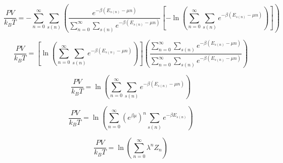 \documentclass[12pt]{article}
\begin{document}
\begin{equation}\frac{PV}{k_BT}=-\sum_{n=0}^\infty\sum_{s(n)}\left(\frac{e^{-\beta(E_{s(n)}-\mu{n})}}{\sum_{n=0}^\infty\sum_{s(n)}e^{-\beta(E_{s(n)}-\mu{n})}} \left[-\ln{\left(\sum_{n=0}^\infty\sum_{s(n)}e^{-\beta(E_{s(n)}-\mu{n})}\right)}\right]\right)\end{equation}

\begin{equation}\frac{PV}{k_BT}=\left[\ln{\left(\sum_{n=0}^\infty\sum_{s(n)}e^{-\beta(E_{s(n)}-\mu{n})}\right)}\right]\left(\frac{\sum_{n=0}^\infty\sum_{s(n)}e^{-\beta(E_{s(n)}-\mu{n})}}{\sum_{n=0}^\infty\sum_{s(n)}e^{-\beta(E_{s(n)}-\mu{n})}}\right) \end{equation}

\begin{equation}\frac{PV}{k_BT}=\ln{\left(\sum_{n=0}^\infty\sum_{s(n)}e^{-\beta(E_{s(n)}-\mu{n})}\right)} \end{equation}

\begin{equation}\frac{PV}{k_BT}=\ln{\left(\sum_{n=0}^\infty \left(e^{\beta\mu}\right)^n\sum_{s(n)}e^{-\beta{E}_{s(n)}}\right)} \end{equation}

\begin{equation}\frac{PV}{k_BT}=\ln{\left(\sum_{n=0}^\infty \lambda^nZ_n\right)} \end{equation}
\end{document}
